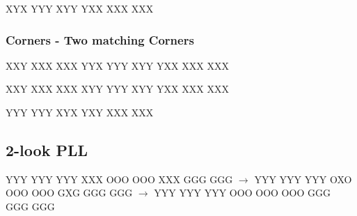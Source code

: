 \documentclass[9pt,dvipsnames]{extarticle}
\begin{document}
\begin{multicols*}{4}
\RubikCubeGreyAll%
\RubikFaceUp%
{X}{Y}{X}
{Y}{Y}{Y}
{X}{Y}{Y}
\RubikFaceFront%
{Y}{X}{X}
{X}{X}{X}
{X}{X}{X}

\subsubsection*{Corners - Two matching Corners}

\RubikCubeGreyAll%
\RubikFaceRight%
{X}{X}{Y}
{X}{X}{X}
{X}{X}{X}
\RubikFaceUp%
{Y}{Y}{X}
{Y}{Y}{Y}
{X}{Y}{Y}
\RubikFaceFront%
{Y}{X}{X}
{X}{X}{X}
{X}{X}{X}

\RubikCubeGreyAll%
\RubikFaceBack%
{X}{X}{Y}
{X}{X}{X}
{X}{X}{X}
\RubikFaceUp%
{X}{Y}{Y}
{Y}{Y}{Y}
{X}{Y}{Y}
\RubikFaceFront%
{Y}{X}{X}
{X}{X}{X}
{X}{X}{X}

\RubikCubeGreyAll%
\RubikFaceUp%
{Y}{Y}{Y}
{Y}{Y}{Y}
{X}{Y}{X}
\RubikFaceFront%
{Y}{X}{Y}
{X}{X}{X}
{X}{X}{X}

\subsection*{2-look PLL}

\noindent%
\RubikFaceUp%
{Y}{Y}{Y}
{Y}{Y}{Y}
{Y}{Y}{Y}%
\RubikFaceRight%
{X}{X}{X}
{O}{O}{O}
{O}{O}{O}%
\RubikFaceFront%
{X}{X}{X}
{G}{G}{G}
{G}{G}{G}%
\ShowCube{\cubesize}{\cubescale}{\DrawRubikCube}%
$\rightarrow$%
\noindent%
\RubikFaceUp%
{Y}{Y}{Y}
{Y}{Y}{Y}
{Y}{Y}{Y}%
\RubikFaceRight%
{O}{X}{O}
{O}{O}{O}
{O}{O}{O}%
\RubikFaceFront%
{G}{X}{G}
{G}{G}{G}
{G}{G}{G}%
\ShowCube{\cubesize}{\cubescale}{\DrawRubikCube}%
$\rightarrow$%
\RubikFaceUp%
{Y}{Y}{Y}
{Y}{Y}{Y}
{Y}{Y}{Y}%
\RubikFaceRight%
{O}{O}{O}
{O}{O}{O}
{O}{O}{O}%
\RubikFaceFront%
{G}{G}{G}
{G}{G}{G}
{G}{G}{G}%
\ShowCube{\cubesize}{\cubescale}{\DrawRubikCube}


\end{multicols*}
\end{document}
